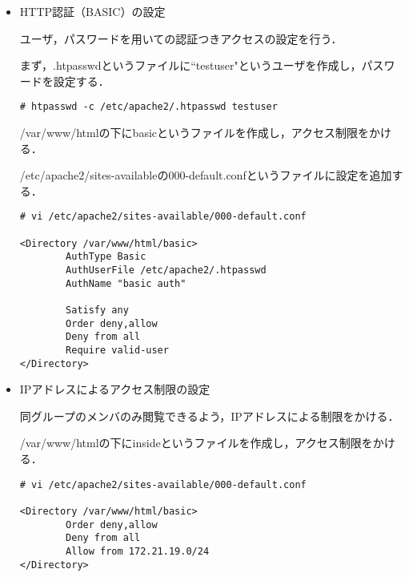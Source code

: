 \documentclass[a4j,titlepage]{jarticle}
\begin{document}
  
\begin{itemize}
\item HTTP認証（BASIC）の設定

ユーザ，パスワードを用いての認証つきアクセスの設定を行う．

まず，.htpasswdというファイルに``testuser"というユーザを作成し，パスワードを設定する．

\begin{center}
\begin{screen}
\begin{verbatim}
# htpasswd -c /etc/apache2/.htpasswd testuser
\end{verbatim}
\end{screen}
\end{center}

/var/www/htmlの下にbasicというファイルを作成し，アクセス制限をかける．

/etc/apache2/sites-availableの000-default.confというファイルに設定を追加する．

\begin{center}
\begin{screen}
\begin{verbatim}
# vi /etc/apache2/sites-available/000-default.conf

<Directory /var/www/html/basic>
        AuthType Basic
        AuthUserFile /etc/apache2/.htpasswd
        AuthName "basic auth"
    
        Satisfy any
        Order deny,allow
        Deny from all
        Require valid-user
</Directory>
\end{verbatim}
\end{screen}
\end{center}

\item IPアドレスによるアクセス制限の設定

同グループのメンバのみ閲覧できるよう，IPアドレスによる制限をかける．

/var/www/htmlの下にinsideというファイルを作成し，アクセス制限をかける．
\begin{center}
\begin{screen}
\begin{verbatim}
# vi /etc/apache2/sites-available/000-default.conf

<Directory /var/www/html/basic>
        Order deny,allow
        Deny from all
        Allow from 172.21.19.0/24
</Directory>
\end{verbatim}
\end{screen}
\end{center}

\end{itemize}
\end{document}
